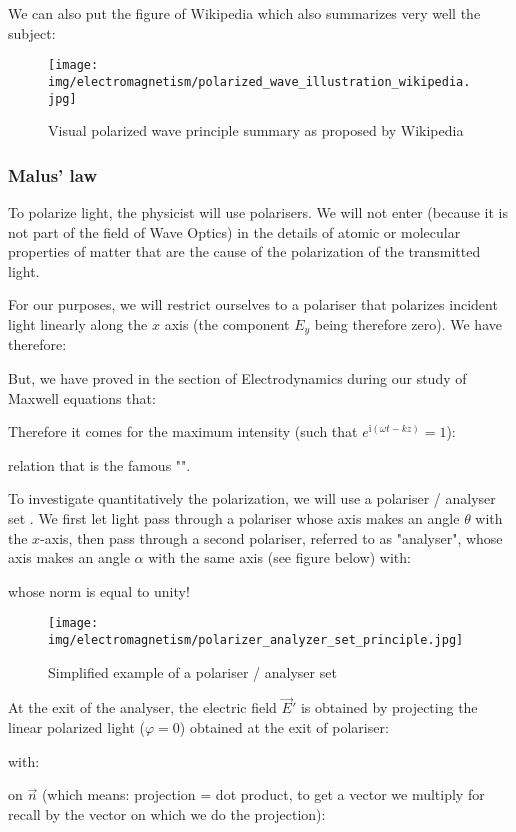 	We can also put the figure of Wikipedia which also summarizes very well the subject:
	\begin{figure}[H]
		\centering
		\texttt{[image: img/electromagnetism/polarized\_wave\_illustration\_wikipedia.jpg]}
		\caption{Visual polarized wave principle summary as proposed by Wikipedia}
	\end{figure}
	
	\pagebreak
	\subsubsection{Malus' law}
	To polarize light, the physicist will use polarisers. We will not enter (because it is not part of the field of Wave Optics) in the details of atomic or molecular properties of matter that are the cause of the polarization of the transmitted light.

	For our purposes, we will restrict ourselves to a polariser that polarizes incident light linearly along the $x$ axis (the component $E_y$ being therefore zero). We have therefore:
	
	But, we have proved in the section of Electrodynamics during our study of Maxwell equations that:
	
	Therefore it comes for the maximum intensity (such that $e^{\mathrm{i}(\omega t-kz)}=1$):
	
	relation that is the famous "".

	To investigate quantitatively the polarization, we will use a polariser / analyser set . We first let light pass through a polariser whose axis makes an angle $\theta$ with the $x$-axis, then pass through a second polariser, referred to as "analyser", whose axis makes an angle $\alpha$ with the same axis (see figure below) with:
	
	whose norm is equal to unity!
	\begin{figure}[H]
		\centering
		\texttt{[image: img/electromagnetism/polarizer\_analyzer\_set\_principle.jpg]}
		\caption{Simplified example of a polariser / analyser set}
	\end{figure}
	At the exit of the analyser, the electric field $\vec{E}'$ is obtained by projecting the linear polarized light ($\varphi=0$) obtained at the exit of polariser:
	
	with:
	
	on $\vec{n}$ (which means: projection = dot product, to get a vector we multiply for recall by the vector on which we do the projection):
	
